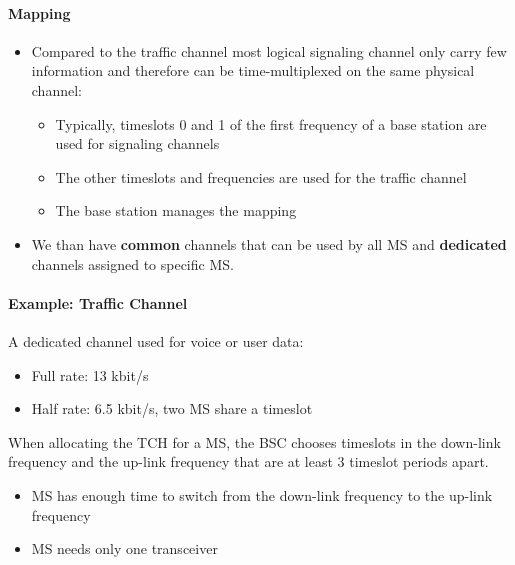 \paragraph{Mapping}

\begin{itemize}
    \item Compared to the traffic channel most logical signaling channel only carry few 
        information and therefore can be time-multiplexed on the same physical 
        channel:
        \begin{itemize}
            \item Typically, timeslots 0 and 1 of the first frequency of a base station are 
                used for signaling channels
            \item The other timeslots and frequencies are used for the traffic channel
            \item The base station manages the mapping
        \end{itemize}

    \item We than have \textbf{common} channels that can be used by all MS
        and \textbf{dedicated} channels assigned to specific MS.
\end{itemize}


\paragraph{Example: Traffic Channel}
A dedicated channel used for voice or user data:
\begin{itemize}
    \item Full rate: 13 kbit/s
    \item Half rate: 6.5 kbit/s, two MS share a timeslot
\end{itemize}

When allocating the TCH for a MS, the BSC chooses timeslots in the down-link
frequency and the up-link frequency that are at least 3 timeslot periods
apart.

\begin{itemize}
    \item MS has enough time to switch from the down-link frequency to the
        up-link frequency
    \item MS needs only one transceiver
\end{itemize}

